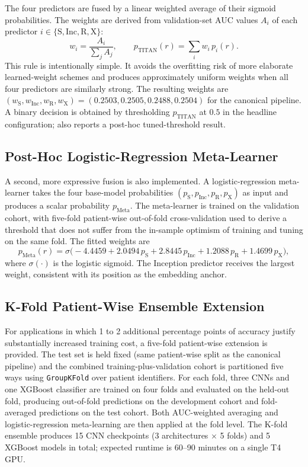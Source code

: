 The four predictors are fused by a linear weighted average of their sigmoid probabilities. The weights are derived from validation-set AUC values $A_i$ of each predictor $i \in \{\mathrm{S}, \mathrm{Inc}, \mathrm{R}, \mathrm{X}\}$:
\begin{equation}
w_i = \frac{A_i}{\sum_{j} A_j}, \qquad
p_{\mathrm{TITAN}}(r) = \sum_i w_i\, p_i(r).
\end{equation}
This rule is intentionally simple. It avoids the overfitting risk of more elaborate learned-weight schemes and produces approximately uniform weights when all four predictors are similarly strong. The resulting weights are $(w_{\mathrm{S}}, w_{\mathrm{Inc}}, w_{\mathrm{R}}, w_{\mathrm{X}}) = (0.2503, 0.2505, 0.2488, 0.2504)$ for the canonical pipeline. A binary decision is obtained by thresholding $p_{\mathrm{TITAN}}$ at $0.5$ in the headline configuration;  also reports a post-hoc tuned-threshold result.

\subsection{Post-Hoc Logistic-Regression Meta-Learner}

A second, more expressive fusion is also implemented. A logistic-regression meta-learner takes the four base-model probabilities $(p_{\mathrm{S}}, p_{\mathrm{Inc}}, p_{\mathrm{R}}, p_{\mathrm{X}})$ as input and produces a scalar probability $p_{\mathrm{Meta}}$. The meta-learner is trained on the validation cohort, with five-fold patient-wise out-of-fold cross-validation used to derive a threshold that does not suffer from the in-sample optimism of training and tuning on the same fold. The fitted weights are
\[
p_{\mathrm{Meta}}(r) = \sigma\bigl(-4.4459 + 2.0494\, p_{\mathrm{S}} + 2.8445\, p_{\mathrm{Inc}} + 1.2088\, p_{\mathrm{R}} + 1.4699\, p_{\mathrm{X}}\bigr),
\]
where $\sigma(\cdot)$ is the logistic sigmoid. The Inception predictor receives the largest weight, consistent with its position as the embedding anchor.

\subsection{K-Fold Patient-Wise Ensemble Extension}
\label{sec:kfold}

For applications in which 1 to 2 additional percentage points of accuracy justify substantially increased training cost, a five-fold patient-wise extension is provided. The test set is held fixed (same patient-wise split as the canonical pipeline) and the combined training-plus-validation cohort is partitioned five ways using \texttt{GroupKFold} over patient identifiers. For each fold, three CNNs and one XGBoost classifier are trained on four folds and evaluated on the held-out fold, producing out-of-fold predictions on the development cohort and fold-averaged predictions on the test cohort. Both AUC-weighted averaging and logistic-regression meta-learning are then applied at the fold level. The K-fold ensemble produces 15 CNN checkpoints (3 architectures $\times$ 5 folds) and 5 XGBoost models in total; expected runtime is 60--90 minutes on a single T4 GPU.

